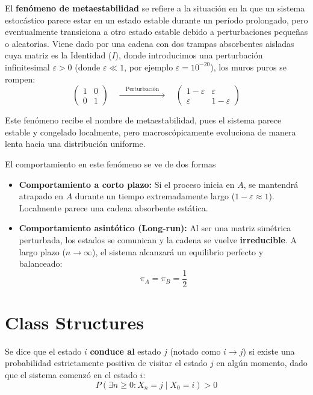 \documentclass[10pt]{book}
\newcommand{\tbf}{\textbf}
\begin{document}
\begin{definicion}
    El \tbf{fenómeno de metaestabilidad} se refiere a la situación en la que un sistema estocástico parece estar en un estado estable durante un período prolongado, pero eventualmente transiciona a otro estado estable debido a perturbaciones pequeñas o aleatorias. Viene dado por una cadena con dos trampas absorbentes aisladas cuya matriz es la Identidad ($I$), donde introducimos una perturbación infinitesimal $\varepsilon > 0$ (donde $\varepsilon \ll 1$, por ejemplo $\varepsilon = 10^{-20}$), los muros puros se rompen:
    \[
    \begin{pmatrix} 1 & 0 \\ 0 & 1 \end{pmatrix} \quad \xrightarrow{\quad \text{Perturbación} \quad} \quad \begin{pmatrix} 1-\varepsilon & \varepsilon \\ \varepsilon & 1-\varepsilon \end{pmatrix}
    \]
\end{definicion}

\begin{observacion}
    Este fenómeno recibe el nombre de metaestabilidad, pues el sistema parece estable y congelado localmente, pero macroscópicamente evoluciona de manera lenta hacia una distribución uniforme.
\end{observacion}
El comportamiento en este fenómeno se ve de dos formas

\begin{itemize}
    \item \tbf{Comportamiento a corto plazo:} Si el proceso inicia en $A$, se mantendrá atrapado en $A$ durante un tiempo extremadamente largo ($1-\varepsilon \approx 1$). Localmente parece una cadena absorbente estática.
    \item \tbf{Comportamiento asintótico (Long-run):} Al ser una matriz simétrica perturbada, los estados se comunican y la cadena se vuelve \textbf{irreducible}. A largo plazo ($n \to \infty$), el sistema alcanzará un equilibrio perfecto y balanceado:
    \[ 
    \pi_A = \pi_B = \frac{1}{2} 
    \]
\end{itemize}

\section{Class Structures}

\begin{definicion}
    Se dice que el estado $i$ \textbf{conduce al} estado $j$ (notado como $i \to j$) si existe una probabilidad estrictamente positiva de visitar el estado $j$ en algún momento, dado que el sistema comenzó en el estado $i$:
    \[
    P(\exists n \geq 0 : X_n = j \mid X_0 = i) > 0
    \]
\end{definicion}
\end{document}
